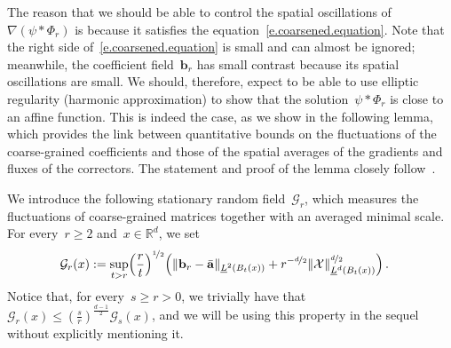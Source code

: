 \documentclass[11pt,twoside]{article} %
\numberwithin{equation}{section}
\theoremstyle{definition}
\let\originalleft\left
\let\originalright\right
\renewcommand{\left}{\mathopen{}\mathclose\bgroup\originalleft}
\renewcommand{\right}{\aftergroup\egroup\originalright}
\newcommand*{\R}{\ensuremath{\mathbb{R}}}
\renewcommand{\b}{\ensuremath{\mathbf{b}}}
\renewcommand{\a}{\mathbf{a}}
\newcommand{\ahom}{\bar{\a}}
\newcommand{\X}{\mathcal{X}}
\newcommand{\indc}{\boldsymbol{1}}
\begin{document}
\smallskip

The reason that we should be able to control the spatial oscillations of~$\nabla (\psi\ast \Phi_r)$ is because it satisfies the equation~\eqref{e.coarsened.equation}. Note that the right side of~\eqref{e.coarsened.equation} is small and can almost be ignored; meanwhile, the coefficient field~$\b_r$ has small contrast because its spatial oscillations are small. We should, therefore, expect to be able to use elliptic regularity (harmonic approximation) to show that the solution~$\psi\ast \Phi_r$ is close to an affine function. This is indeed the case, as we show in the following lemma, which provides the link between quantitative bounds on the fluctuations of the coarse-grained coefficients and those of the spatial averages of the gradients and fluxes of the correctors. The statement and proof of the lemma closely follow~\cite[Lemma 4.15]{AKM}. 

\smallskip

We introduce the following stationary random field~$\mathcal{G}_r$, which measures the fluctuations of coarse-grained matrices together with an averaged minimal scale. 
For every~$r \geq 2$ and~$x \in \R^d$, we set
\begin{align}  
\label{e.uglyG}
\mathcal{G}_r(x) 
& 
: = 
\sup_{t>r} \Bigl(\frac rt \Bigr)^{\nicefrac 12} 
\Bigl( 
\| %
\b_r - \ahom \|_{\underline{L}^2 \left( B_{t}(x) \right)} 
+  r^{-\nicefrac d2} \left\| \X %
\right\|_{\underline{L}^d \left( B_{t}(x) \right)}^{\nicefrac d2}  
 \Bigr)
\,.
\end{align}
Notice that, for every~$s \geq r >0$, we trivially have that~$\mathcal{G}_r(x) \leq (\frac sr)^{\frac{d-1}{2}} \mathcal{G}_s(x)$, and we will be using this property in the sequel without explicitly mentioning it.
\end{document}
